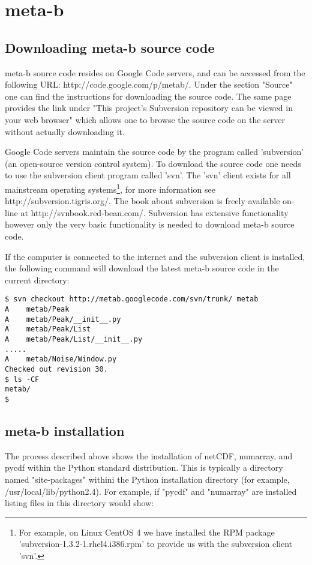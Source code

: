 \section{meta-b}

\subsection{Downloading meta-b source code}

meta-b source code resides on Google Code servers, and can be accessed
from the following URL: http://code.google.com/p/metab/. Under the
section "Source" one can find the instructions for downloading the
source code. The same page provides the link under "This project's
Subversion repository can be viewed in your web browser" which allows
one to browse the source code on the server without actually downloading
it.

Google Code servers maintain the source code by the program called
'subversion' (an open-source version control system).  To download the
source code one needs to use the subversion client program called 'svn'.
The 'svn' client exists for all mainstream operating systems\footnote{For
example, on Linux CentOS 4 we have installed the RPM package
'subversion-1.3.2-1.rhel4.i386.rpm' to provide us with the subversion
client 'svn'.}, for more information see http://subversion.tigris.org/.
The book about subversion is freely available on-line at
http://svnbook.red-bean.com/. Subversion has extensive functionality
however only the very basic functionality is needed to download meta-b
source code.

If the computer is connected to the internet and the subversion client
is installed, the following command will download the latest meta-b 
source code in the current directory:

\begin{verbatim}
$ svn checkout http://metab.googlecode.com/svn/trunk/ metab
A    metab/Peak
A    metab/Peak/__init__.py
A    metab/Peak/List
A    metab/Peak/List/__init__.py
.....
A    metab/Noise/Window.py
Checked out revision 30.
$ ls -CF
metab/
$
\end{verbatim}

\subsection{meta-b installation}

The process described above shows the installation of netCDF, numarray,
and pycdf within the Python standard distribution. This is typically
a directory named "site-packages" withini the Python installation
directory (for example, /usr/local/lib/python2.4). For example, if
"pycdf" and "numarray" are installed listing files in this directory
would show:


